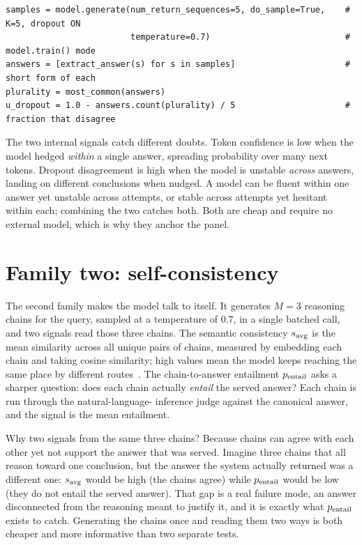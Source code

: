 \begin{lstlisting}[caption={Dropout disagreement, condensed from \texttt{caem/verification/verifier.py}.}, label={lst:udropout}]
samples = model.generate(num_return_sequences=5, do_sample=True,    # K=5, dropout ON
                         temperature=0.7)                           # model.train() mode
answers = [extract_answer(s) for s in samples]                      # short form of each
plurality = most_common(answers)
u_dropout = 1.0 - answers.count(plurality) / 5                      # fraction that disagree
\end{lstlisting}

\begin{intuition}
The two internal signals catch different doubts. Token confidence is low when the
model hedged \emph{within} a single answer, spreading probability over many next
tokens. Dropout disagreement is high when the model is unstable \emph{across}
answers, landing on different conclusions when nudged. A model can be fluent within
one answer yet unstable across attempts, or stable across attempts yet hesitant
within each; combining the two catches both. Both are cheap and require no external
model, which is why they anchor the panel.
\end{intuition}

\section{Family two: self-consistency}
\label{sec:verifier-consistency}

The second family makes the model talk to itself. It generates $M=3$ reasoning
chains for the query, sampled at a temperature of $0.7$, in a single batched call,
and two signals read those three chains. The semantic consistency $s_{\text{avg}}$ is the
mean similarity across all unique pairs of chains, measured by embedding each chain
and taking cosine similarity; high values mean the model keeps reaching the same
place by different routes~\cite{wang2023selfconsistency}. The chain-to-answer
entailment $p_{\text{entail}}$ asks a sharper question: does each chain actually
\emph{entail} the served answer? Each chain is run through the natural-language-
inference judge against the canonical answer, and the signal is the mean entailment.

\begin{intuition}
Why two signals from the same three chains? Because chains can agree with each other
yet not support the answer that was served. Imagine three chains that all reason
toward one conclusion, but the answer the system actually returned was a different
one: $s_{\text{avg}}$ would be high (the chains agree) while $p_{\text{entail}}$ would be low (they do
not entail the served answer). That gap is a real failure mode, an answer
disconnected from the reasoning meant to justify it, and it is exactly what
$p_{\text{entail}}$ exists to catch. Generating the chains once and reading them two ways is
both cheaper and more informative than two separate tests.
\end{intuition}

